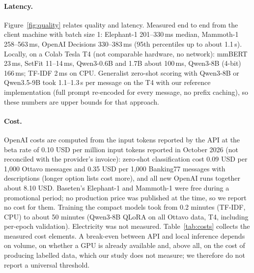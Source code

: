 \paragraph{Latency.} Figure~\ref{fig:quality} relates quality and latency. Measured end to end from the client machine with batch size 1: Elephant-1 201--330\,ms median, Mammoth-1 258--563\,ms,
OpenAI Decisions 330--383\,ms (95th percentiles up to about 1.1\,s). Locally, on a Colab Tesla T4 (not comparable hardware, no network):
mmBERT 23\,ms, SetFit 11--14\,ms, Qwen3-0.6B and 1.7B about 100\,ms, Qwen3-8B (4-bit) 166\,ms; TF-IDF 2\,ms on CPU. Generalist
zero-shot scoring with Qwen3-8B or Qwen3.5-9B took 1.1--1.3\,s per message on the T4 with our reference implementation (full prompt
re-encoded for every message, no prefix caching), so these numbers are upper bounds for that approach.

\paragraph{Cost.} OpenAI costs are computed from the input tokens reported by the API at the beta rate of 0.10 USD per million
input tokens reported in October 2026 (not reconciled with the provider's invoice): zero-shot classification cost 0.09 USD per
1{,}000 Ottavo messages and 0.35 USD per 1{,}000 Banking77 messages with descriptions (longer option lists cost more), and all new
OpenAI runs together about 8.10 USD. Baseten's Elephant-1 and Mammoth-1 were free during a promotional period;
no production price was published at the time, so we report no cost for them. Training the compact models took from 0.2 minutes
(TF-IDF, CPU) to about 50 minutes (Qwen3-8B QLoRA on all Ottavo data, T4, including per-epoch validation). Electricity was not
measured. Table~\ref{tab:costs} collects the measured cost elements. A break-even between API and local inference depends on volume, on whether a GPU is already available and, above all, on the
cost of producing labelled data, which our study does not measure; we therefore do not report a universal threshold.
